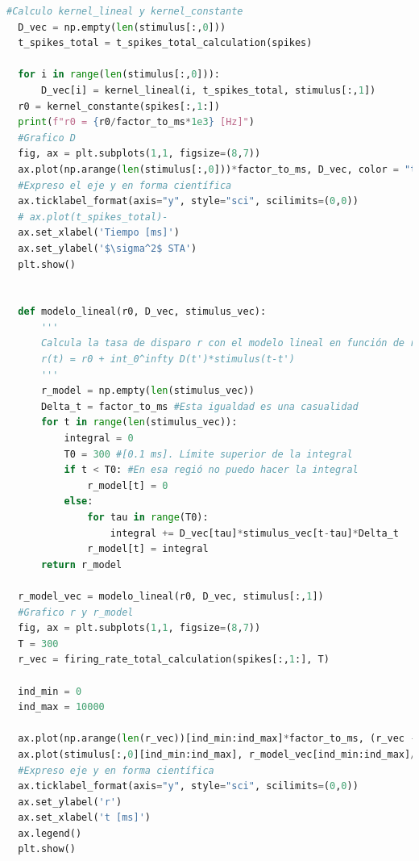 \documentclass[aps,prb,twocolumn,superscriptaddress,floatfix,longbibliography]{revtex4-2}
\begin{document}
\begin{lstlisting}[language=Python]
  #Calculo kernel_lineal y kernel_constante
  D_vec = np.empty(len(stimulus[:,0]))
  t_spikes_total = t_spikes_total_calculation(spikes)
  
  for i in range(len(stimulus[:,0])):
      D_vec[i] = kernel_lineal(i, t_spikes_total, stimulus[:,1])
  r0 = kernel_constante(spikes[:,1:])
  print(f"r0 = {r0/factor_to_ms*1e3} [Hz]")
  #Grafico D
  fig, ax = plt.subplots(1,1, figsize=(8,7))
  ax.plot(np.arange(len(stimulus[:,0]))*factor_to_ms, D_vec, color = "tab:blue")
  #Expreso el eje y en forma científica
  ax.ticklabel_format(axis="y", style="sci", scilimits=(0,0))
  # ax.plot(t_spikes_total)-
  ax.set_xlabel('Tiempo [ms]')
  ax.set_ylabel('$\sigma^2$ STA')
  plt.show()
  
  
  def modelo_lineal(r0, D_vec, stimulus_vec):
      '''
      Calcula la tasa de disparo r con el modelo lineal en función de r0, D_vec y stimulus. 
      r(t) = r0 + int_0^infty D(t')*stimulus(t-t')
      '''
      r_model = np.empty(len(stimulus_vec))
      Delta_t = factor_to_ms #Esta igualdad es una casualidad
      for t in range(len(stimulus_vec)):
          integral = 0
          T0 = 300 #[0.1 ms]. Límite superior de la integral
          if t < T0: #En esa regió no puedo hacer la integral
              r_model[t] = 0
          else: 
              for tau in range(T0):
                  integral += D_vec[tau]*stimulus_vec[t-tau]*Delta_t
              r_model[t] = integral
      return r_model
  
  r_model_vec = modelo_lineal(r0, D_vec, stimulus[:,1])
  #Grafico r y r_model
  fig, ax = plt.subplots(1,1, figsize=(8,7))
  T = 300
  r_vec = firing_rate_total_calculation(spikes[:,1:], T)
  
  ind_min = 0
  ind_max = 10000
  
  ax.plot(np.arange(len(r_vec))[ind_min:ind_max]*factor_to_ms, (r_vec - r0)[ind_min:ind_max], color = "tab:red", label = "$r - r_0$")
  ax.plot(stimulus[:,0][ind_min:ind_max], r_model_vec[ind_min:ind_max]/1e9, color = "tab:blue", label = "$r_{model}$")
  #Expreso eje y en forma científica
  ax.ticklabel_format(axis="y", style="sci", scilimits=(0,0))
  ax.set_ylabel('r')
  ax.set_xlabel('t [ms]')
  ax.legend()
  plt.show()
  

\end{lstlisting}


\end{document}
